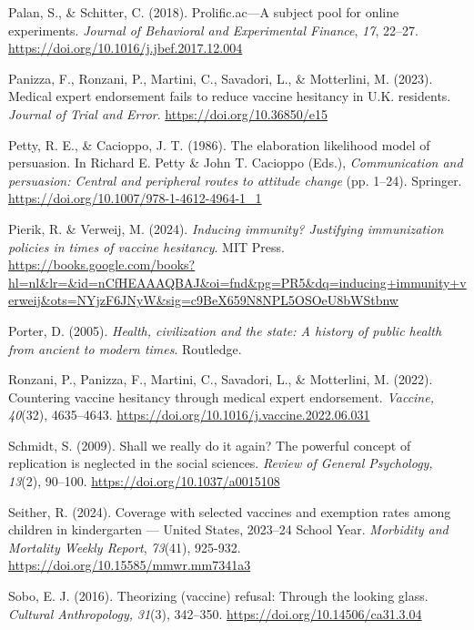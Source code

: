 \documentclass[authordate, reflection]{jote-new-article}
\begin{document}
	Palan, S., \& Schitter, C. (2018). Prolific.ac—A subject pool for online experiments. \emph{Journal of Behavioral and Experimental Finance}, \emph{17}, 22--27. \url{https://doi.org/10.1016/j.jbef.2017.12.004}



	Panizza, F., Ronzani, P., Martini, C., Savadori, L., \& Motterlini, M. (2023). Medical expert endorsement fails to reduce vaccine hesitancy in U.K. residents. \emph{Journal of Trial and Error}. \url{https://doi.org/10.36850/e15}



	Petty, R. E., \& Cacioppo, J. T. (1986). The elaboration likelihood model of persuasion. In Richard E. Petty \& John T. Cacioppo (Eds.), \emph{Communication and persuasion: Central and peripheral routes to attitude change }(pp. 1--24). Springer. \url{https://doi.org/10.1007/978-1-4612-4964-1\_1}



	Pierik, R. \& Verweij, M. (2024). \emph{Inducing immunity? Justifying immunization policies in times of vaccine hesitancy}. MIT Press. \url{https://books.google.com/books?hl=nl\&lr=\&id=nCfHEAAAQBAJ\&oi=fnd\&pg=PR5\&dq=inducing+immunity+verweij\&ots=NYjzF6JNyW\&sig=c9BeX659N8NPL5OSOeU8bWStbnw}



	Porter, D. (2005). \emph{Health, civilization and the state: A history of public health from ancient to modern times}. Routledge.



	Ronzani, P., Panizza, F., Martini, C., Savadori, L., \& Motterlini, M. (2022). Countering vaccine hesitancy through medical expert endorsement. \emph{Vaccine,} \emph{40}(32), 4635--4643. \url{https://doi.org/10.1016/j.vaccine.2022.06.031}



	Schmidt, S. (2009). Shall we really do it again? The powerful concept of replication is neglected in the social sciences. \emph{Review of General Psychology,} \emph{13}(2), 90--100. \url{https://doi.org/10.1037/a0015108}



	Seither, R. (2024). Coverage with selected vaccines and exemption rates among children in kindergarten — United States, 2023--24 School Year. \emph{Morbidity and Mortality Weekly Report},\emph{ 73}(41), 925-932. \url{https://doi.org/10.15585/mmwr.mm7341a3}



	Sobo, E. J. (2016). Theorizing (vaccine) refusal: Through the looking glass. \emph{Cultural Anthropology,} \emph{31}(3), 342--350. \url{https://doi.org/10.14506/ca31.3.04}
\end{document}
